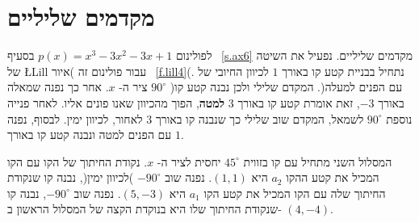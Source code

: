 

\section{מקדמים שליליים}\label{s.negative}
לפולינום 
$p(x)=x^3-3x^2-3x+1$
בסעיף%
~\ref{s.ax6}
מקדמים שליליים. נפעיל את השיטה של 
\L{Lill}
עבור פולינום זה )איור~%
\ref{f.lill4}(.
נתחיל בבניית קטע קו באורך
$1$
לכיוון החיובי של ציר ה-%
$x$. 
אחר כך נפנה שמאלה
$90^\circ$
)עם הפנים למעלה(. המקדם שלילי ולכן נבנה קטע קו באורך 
$-3$,
זאת אומרת קטע קו באורך
$3$
\textbf{למטה},
הפוך מהכיוון שאנו פונים אליו. לאחר פנייה נוספת
$90^\circ$
לשמאל, המקדם שוב שלילי כך שנבנה קו באורך
$3$
לאחור, לכיוון ימין. לבסוף, נפנה עם הפנים למטה ונבנה קטע קו באורך
$1$.

המסלול השני מתחיל עם קו בזווית
$45^\circ$
יחסית לציר ה-%
$x$.
נקודת החיתוך של הקו עם הקו המכיל את קטע ההקו
$a_2$
היא
$(1,1)$.
נפנה שוב
$-90^\circ$
)לכיוון ימין(, נבנה קו שנקודת החיתוך שלה עם הקו המכיל את קטע הקו 
$a_1$
היא
$(5,-3)$.
נפנה שוב
 $-90^\circ$,
נבנה קו שנקודת החיתוך שלו היא בנוקדת הקצה של המסלול הראשון ב-%
$(4,-4)$.

